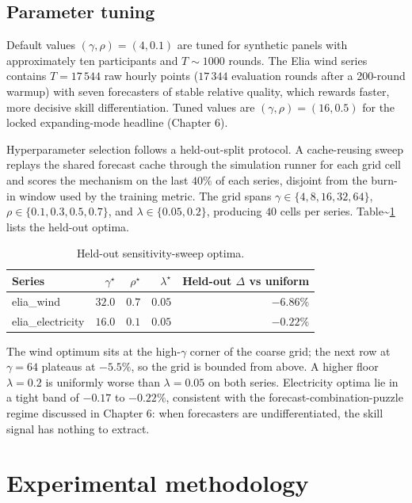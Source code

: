 \documentclass[
  11pt,
  a4paper,
  oneside]{report}
\begin{document}
\section{Parameter tuning}\label{parameter-tuning}

Default values \((\gamma, \rho) = (4, 0.1)\) are tuned for synthetic
panels with approximately ten participants and \(T \sim 1000\) rounds.
The Elia wind series contains \(T = 17\,544\) raw hourly points
(\(17\,344\) evaluation rounds after a 200-round warmup) with seven
forecasters of stable relative quality, which rewards faster, more
decisive skill differentiation. Tuned values are
\((\gamma, \rho) = (16, 0.5)\) for the locked expanding-mode headline
(Chapter 6).

Hyperparameter selection follows a held-out-split protocol. A
cache-reusing sweep replays the shared forecast cache through the
simulation runner for each grid cell and scores the mechanism on the
last \(40\%\) of each series, disjoint from the burn-in window used by
the training metric. The grid spans \(\gamma \in \{4, 8, 16, 32, 64\}\),
\(\rho \in \{0.1, 0.3, 0.5, 0.7\}\), and \(\lambda \in \{0.05, 0.2\}\),
producing \(40\) cells per series.
Table\textasciitilde{}\ref{tab:sweep-optima} lists the held-out optima.

\begin{table}[h]
\centering
\small
\begin{tabular}{lrrrr}
\toprule
Series & $\gamma^\star$ & $\rho^\star$ & $\lambda^\star$
  & Held-out $\Delta$ vs uniform \\
\midrule
elia\_wind & $32.0$ & $0.7$ & $0.05$ & $-6.86\%$ \\
elia\_electricity & $16.0$ & $0.1$ & $0.05$ & $-0.22\%$ \\
\bottomrule
\end{tabular}
\caption{Held-out sensitivity-sweep optima.}
\label{tab:sweep-optima}
\end{table}

The wind optimum sits at the high-\(\gamma\) corner of the coarse grid;
the next row at \(\gamma = 64\) plateaus at \(-5.5\%\), so the grid is
bounded from above. A higher floor \(\lambda = 0.2\) is uniformly worse
than \(\lambda = 0.05\) on both series. Electricity optima lie in a
tight band of \(-0.17\) to \(-0.22\%\), consistent with the
forecast-combination-puzzle regime discussed in Chapter 6: when
forecasters are undifferentiated, the skill signal has nothing to
extract.

\chapter{Experimental methodology}\label{ch:methodology}
\end{document}
